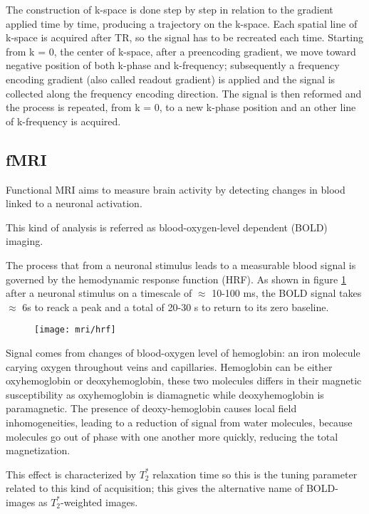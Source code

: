 \documentclass[a4paper,11pt]{article}
\begin{document}
The construction of k-space is done step by step in relation to the gradient applied time by time, producing a trajectory on the k-space.
Each spatial line of k-space is acquired after TR, so the signal has to be recreated each time.
Starting from k = 0, the center of k-space, after a preencoding gradient, we move toward negative position of both k-phase and k-frequency; subsequently a frequency encoding gradient (also called readout gradient) is applied and the signal is collected along the frequency encoding direction.
The signal is then reformed and the process is repeated, from k = 0, to a new k-phase position and an other line of k-frequency is acquired.



\subsection{fMRI}
Functional MRI aims to measure brain activity by detecting changes in blood linked to a neuronal activation.

This kind of analysis is referred as blood-oxygen-level dependent (BOLD) imaging.


The process that from a neuronal stimulus leads to a measurable blood signal is governed by the hemodynamic response function (HRF).
As shown in figure \ref{fig:hrf} after a neuronal stimulus on a timescale of $\approx$ 10-100 ms, the BOLD signal takes $\approx$ 6s to reack a peak and a total of 20-30 s to return to its zero baseline.

\begin{figure}[h]
\texttt{[image: mri/hrf]}
\caption{}
\label{fig:hrf}
\end{figure}



Signal comes from changes of blood-oxygen level of hemoglobin: an iron molecule carying oxygen throughout veins and capillaries.
Hemoglobin can be either oxyhemoglobin or deoxyhemoglobin, these two molecules differs in their magnetic susceptibility as oxyhemoglobin is diamagnetic while deoxyhemoglobin is paramagnetic.
The presence of deoxy-hemoglobin causes local field inhomogeneities, leading to a reduction of signal from water molecules, because molecules go out of phase with one another more quickly, reducing the total magnetization.

This effect is characterized by $T_2^{\ast}$ relaxation time so this is the tuning parameter related to this kind of acquisition; this gives the alternative name of BOLD-images as $T_2^{\ast}$-weighted images.
\end{document}
